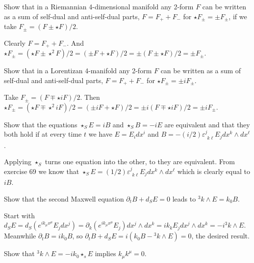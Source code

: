 \begin{p}{Show that in a Riemannian 4-dimensional manifold any 2-form $F$ can be written as a sum of self-dual and 
anti-self-dual parts, $F=F_++F_-$ for $\star F_\pm=\pm F_\pm$, if we take $F_\pm=(F\pm\star F)/2$.}
\end{p}

Clearly $F=F_++F_-$. And 
$\star F_\pm=(\star F\pm\star^2 F)/2=(\pm F+\star F)/2=\pm(F\pm\star F)/2=\pm F_\pm$.

\begin{p}{Show that in a Lorentizan 4-manifold any 2-form $F$ can be written as a sum of self-dual and 
anti-self-dual parts, $F=F_++F_-$ for $\star F_\pm=\pm i F_\pm$.}
\end{p}

Take $F_\pm=(F\mp \star i F)/2$. Then $\star F_\pm=(\star F\mp\star^2 i F)/2=(\pm i F+\star F)/2=\pm i(F\mp \star  i F)/2=\pm i F_\pm$.

\begin{p}{Show that the equations $\star_S E=iB$ and $\star_S B=-i E$ are 
equivalent and that they both hold if at every time $t$ we have $E=E_i dx^i$ and $B=-(i/2)\varepsilon^j_{\phantom{j}k\ell}E_j dx^k\wedge dx^\ell$.}
\end{p}

Applying $\star_S$ turns one equation into the other, to they are equivalent. 
From exercise 69 we know that $\star_S E=(1/2)\varepsilon^j_{\phantom{j}k\ell}E_j dx^k\wedge dx^\ell$ which is clearly equal to $iB$.

\begin{p}{Show that the second Maxwell equation $\partial_t B+d_SE=0$ leads to ${}^3k\wedge E=k_0 B$.}
\end{p}

Start with $d_S E=d_S(e^{ik_\mu x^\mu}E_j dx^j)=\partial_k(e^{ik_\mu x^\mu}E_j)dx^j\wedge dx^k=i k_k E_jdx^j\wedge dx^k=-i{}^3k\wedge E$. Meanwhile 
$\partial_t B=ik_0 B$, so $\partial_t B+d_SE=i(k_0 B-{}^3k\wedge E)=0$, the desired 
result.

\begin{p}%
{Show that ${}^3k\wedge E=-ik_0 \star_s E$ implies $k_\mu k^\mu=0$.}
\end{p}


